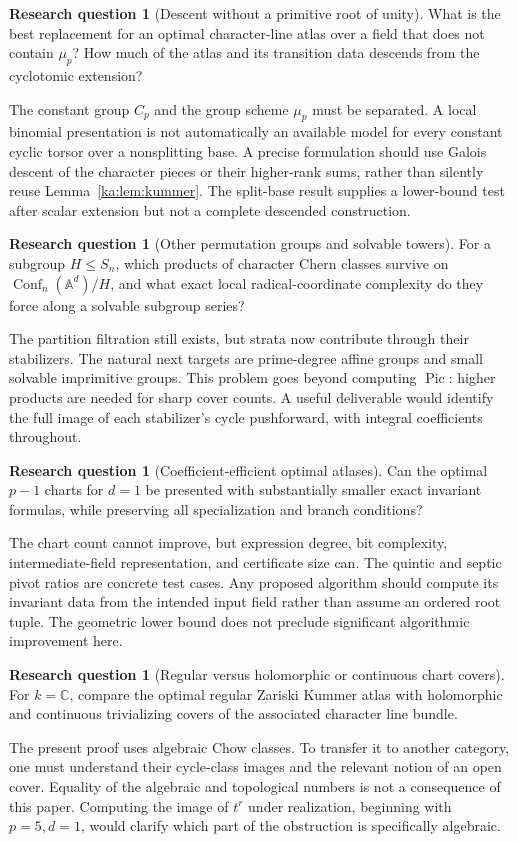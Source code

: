 \documentclass[11pt,a4paper]{article}
\theoremstyle{definition}
\newtheorem{question}[theorem]{Research question}
\theoremstyle{remark}
\newcommand{\C}{\mathbb C}
\newcommand{\Pic}{\operatorname{Pic}}
\newcommand{\A}{\mathbb A}
\newcommand{\Conf}{\operatorname{Conf}}
\begin{document}
\begin{question}[Descent without a primitive root of unity]
What is the best replacement for an optimal character-line atlas over
a field that does not contain $\mu_p$? How much of the atlas and its
transition data descends from the cyclotomic extension?
\end{question}
The constant group $C_p$ and the group scheme $\mu_p$ must be
separated. A local binomial presentation is not automatically an
available model for every constant cyclic torsor over a nonsplitting
base. A precise formulation should use Galois descent of the character
pieces or their higher-rank sums, rather than silently reuse
Lemma~\ref{ka:lem:kummer}. The split-base result supplies a lower-bound
test after scalar extension but not a complete descended construction.

\begin{question}[Other permutation groups and solvable towers]
For a subgroup $H\leq S_n$, which products of character Chern classes
survive on $\Conf_n(\A^d)/H$, and what exact local radical-coordinate
complexity do they force along a solvable subgroup series?
\end{question}
The partition filtration still exists, but strata now contribute through
their stabilizers. The natural next targets are prime-degree affine
groups and small solvable imprimitive groups. This problem goes beyond
computing $\Pic$: higher products are needed for sharp cover counts.
A useful deliverable would identify the full image of each stabilizer's
cycle pushforward, with integral coefficients throughout.

\begin{question}[Coefficient-efficient optimal atlases]
Can the optimal $p-1$ charts for $d=1$ be presented with substantially
smaller exact invariant formulas, while preserving all specialization
and branch conditions?
\end{question}
The chart count cannot improve, but expression degree, bit complexity,
intermediate-field representation, and certificate size can. The
quintic and septic pivot ratios are concrete test cases. Any proposed
algorithm should compute its invariant data from the intended input
field rather than assume an ordered root tuple. The geometric lower
bound does not preclude significant algorithmic improvement here.

\begin{question}[Regular versus holomorphic or continuous chart covers]
For $k=\C$, compare the optimal regular Zariski Kummer atlas with
holomorphic and continuous trivializing covers of the associated
character line bundle.
\end{question}
The present proof uses algebraic Chow classes. To transfer it to another
category, one must understand their cycle-class images and the relevant
notion of an open cover. Equality of the algebraic and topological
numbers is not a consequence of this paper. Computing the image of
$t^r$ under realization, beginning with $p=5,d=1$, would clarify which
part of the obstruction is specifically algebraic.
\end{document}
